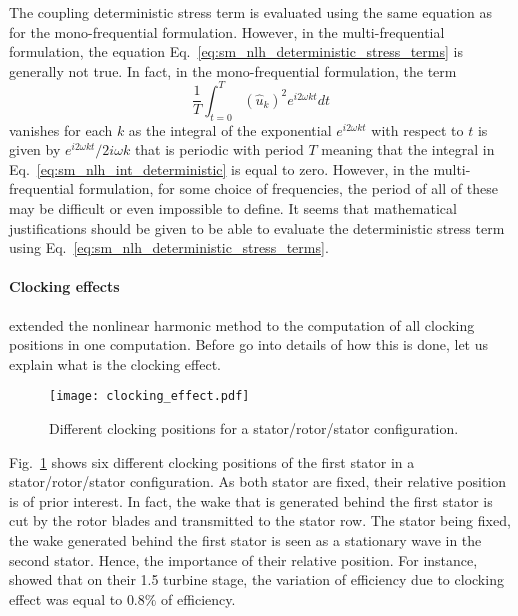 The coupling deterministic stress term is evaluated using the
same equation as for the mono-frequential formulation.
However, in the multi-frequential formulation, 
the equation Eq.~\ref{eq:sm_nlh_deterministic_stress_terms}
is generally not true.
In fact, in the mono-frequential formulation, the term
\begin{equation}
	\frac{1}{T} \int_{t=0}^{T} (\widehat{u}_k)^2
		e^{i 2 \omega k t} dt
	\label{eq:sm_nlh_int_deterministic}
\end{equation}
vanishes for each $k$ as the integral of the
exponential $e^{i 2 \omega k t}$ with respect to $t$
is given by $e^{i 2 \omega k t} / 2 i \omega k$ that is
periodic with period $T$ meaning that the integral in 
Eq.~\ref{eq:sm_nlh_int_deterministic} is equal to zero. 
However, in the multi-frequential
formulation, for some choice of frequencies, the period of all
of these may be difficult or even impossible to define. It
seems that mathematical justifications should be given
to be able to evaluate the deterministic stress term 
using Eq.~\ref{eq:sm_nlh_deterministic_stress_terms}.

\paragraph{Clocking effects}
\citet{He2002} extended the nonlinear harmonic method to
the computation of all clocking positions in one computation. Before
go into details of how this is done, let us explain what is
the clocking effect.
\begin{figure}[htbp]
  \centering 
  \texttt{[image: clocking\_effect.pdf]}
  \caption{Different clocking positions for a stator/rotor/stator
  configuration.}
  \label{fig:sm_nlh_clocking_effect}
\end{figure}
Fig.~\ref{fig:sm_nlh_clocking_effect} shows six
different clocking positions of the first stator
in a stator/rotor/stator configuration.
As both stator are fixed, their relative position is of 
prior interest. In fact, the wake that is generated behind the first stator
is cut by the rotor blades and transmitted to 
the stator row. The stator being fixed, the wake generated
behind the first stator is seen as a stationary wave in the second stator.
Hence, the importance of their relative position. For instance,
\citet{Huber1996} showed that
on their 1.5 turbine stage, the variation of efficiency due to clocking
effect was equal to $0.8\%$ of efficiency.

